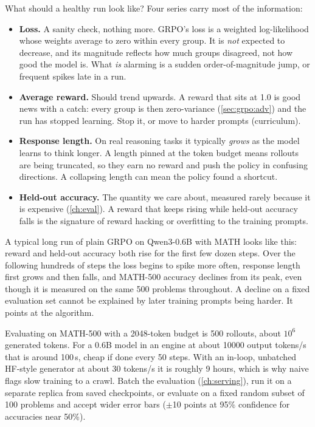 What should a healthy run look like? Four series carry most of the information:
\begin{itemize}
\item \textbf{Loss.} A sanity check, nothing more. GRPO's loss is a weighted
log-likelihood whose weights average to zero within every group. It is \emph{not} expected
to decrease, and its magnitude reflects how much groups disagreed, not how good the
model is. What \emph{is} alarming is a sudden order-of-magnitude jump, or frequent spikes
late in a run.
\item \textbf{Average reward.} Should trend upwards. A reward that sits at 1.0 is good news
with a catch: every group is then zero-variance (\cref{sec:grpo:adv}) and the run has stopped
learning. Stop it, or move to harder prompts (curriculum).
\item \textbf{Response length.} On real reasoning tasks it typically \emph{grows} as the
model learns to think longer. A length pinned at the token budget means rollouts are being
truncated, so they earn no reward and push the policy in confusing directions. A collapsing
length can mean the policy found a shortcut.
\item \textbf{Held-out accuracy.} The quantity we care about, measured rarely because it is
expensive (\cref{ch:eval}). A reward that keeps rising while held-out accuracy falls is the
signature of reward hacking or overfitting to the training prompts.
\end{itemize}
A typical long run of plain GRPO on Qwen3-0.6B with MATH looks like this: reward and held-out
accuracy both rise for the first few dozen steps. Over the following hundreds of steps the loss
begins to spike more often, response length first grows and then falls, and MATH-500
accuracy declines from its peak, even though it is measured on the same 500 problems
throughout. A decline on a fixed evaluation set cannot be explained by later training
prompts being harder. It points at the algorithm.

\begin{napkinmath}
Evaluating on MATH-500 with a 2048-token budget is 500 rollouts, about $10^6$ generated
tokens. For a 0.6B model in an engine at about \num{10000} output tokens/s that is around 100\,s,
cheap if done every 50 steps. With an in-loop, unbatched HF-style generator at about 30 tokens/s
it is roughly 9 hours, which is why naive  flags slow training to a crawl.
Batch the evaluation (\cref{ch:serving}), run it on a separate replica from saved
checkpoints, or evaluate on a fixed random subset of 100 problems and accept wider error
bars ($\pm$10 points at 95\% confidence for accuracies near 50\%).
\end{napkinmath}

